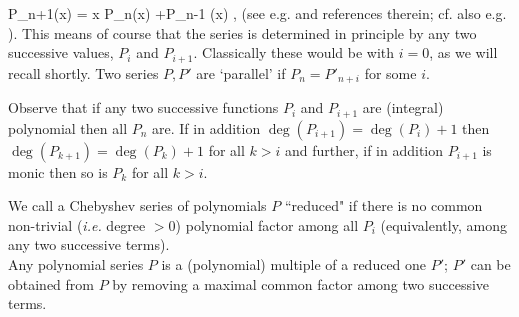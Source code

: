 
\beq \label{eq:Cheby0} 
P_{n+1}(x) = x P_{n}(x) +P_{n-1} (x)   ,
\eq  
(see e.g. \cite[\S6.3.3]{Martin91} and references therein; cf. also e.g. \cite{KarlinStudden}).
This means of course that the series is 
determined in principle by any two successive values, $P_i$ and $P_{i+1}$. 
Classically these would be with $i=0$, as we will recall shortly. 
Two series $P,P'$ are `parallel' if $P_n = P'_{n+i}$ for some $i$. 


\mdef  \label{pr:cheb1}
Observe that if any two successive functions $P_i$ and $P_{i+1}$ are (integral) polynomial then all $P_n$ are. If in addition $\deg(P_{i+1})=\deg(P_i) + 1$  then $\deg(P_{k+1})=\deg(P_{k}) + 1$ for all $k>i$ 
and further, if in addition
$P_{i+1}$ is monic 
then so is $P_k$ for all $k>i$. 

\mdef We call a Chebyshev series of polynomials $P$ ``reduced" if there is no common non-trivial (\textit{i.e.} degree $>0$) polynomial factor 
among all $P_i$ (equivalently, among any two successive %
terms). 
\\ 
Any polynomial series $P$ is a (polynomial) multiple %
of a reduced one $P'$; $P'$ can be obtained from $P$ by removing a maximal common factor among two successive terms. 

